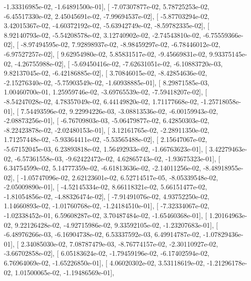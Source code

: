 \documentclass{article}
\begin{document}
         -1.33316985e-02,  -1.64891500e-01],
       [ -7.07307877e-02,   5.78725253e-02,  -6.45517330e-02,
          2.45045691e-02,  -7.99694537e-02],
       [ -5.87703294e-02,   3.42015367e-02,  -4.60372192e-02,
         -5.63942749e-02,  -8.59782335e-02],
       [  8.92140793e-02,  -5.54208578e-02,   3.12740902e-02,
         -2.74543810e-02,  -6.75559366e-02],
       [ -8.97494595e-02,   7.92898937e-02,  -8.98459297e-02,
         -6.78446012e-02,  -6.97527257e-02],
       [  9.62954980e-02,   5.85831517e-02,  -9.45669831e-02,
          9.93375145e-02,  -4.26755988e-02],
       [ -5.69450416e-02,  -7.62631051e-02,  -6.10883720e-03,
          9.82137045e-02,  -6.42186885e-02],
       [  3.70846015e-02,  -8.42854636e-02,  -2.15276340e-02,
         -5.75903549e-02,  -1.60938885e-01],
       [  8.29871585e-03,   1.00460700e-01,   1.25959746e-02,
         -3.69765539e-02,  -7.59418207e-02],
       [ -8.54247028e-02,   4.78357049e-02,   6.44149820e-02,
          1.71177668e-02,  -1.25718058e-01],
       [  7.54493596e-02,   9.22994226e-03,  -3.08813536e-02,
         -6.00159943e-02,  -2.08873256e-01],
       [ -6.76709803e-03,  -5.06479877e-02,   6.42850303e-02,
         -8.22423878e-02,  -2.02480153e-01],
       [  3.12161765e-02,  -2.28911350e-02,   1.71257448e-02,
         -5.93364411e-02,  -5.53565488e-02],
       [  2.15647067e-02,  -5.67152045e-03,   6.23893818e-02,
          1.56492933e-02,  -1.66763623e-01],
       [  3.42279463e-02,  -6.57361558e-03,  -9.62422472e-02,
          4.62865743e-02,  -1.93675323e-01],
       [  6.34754599e-02,   5.14777359e-02,  -6.61813636e-02,
         -2.14011256e-02,  -8.48918955e-02],
       [ -1.05747096e-02,   2.62123601e-02,   6.52714517e-05,
         -8.05339548e-02,  -2.05009890e-01],
       [ -4.52145334e-02,   8.66118321e-02,   5.66151477e-02,
         -1.81054856e-02,  -4.88326474e-02],
       [ -7.91491076e-02,   4.93752250e-02,   1.14660893e-02,
         -1.01760768e-02,  -1.24184510e-01],
       [ -7.32334067e-02,  -1.02338452e-01,   6.59608287e-02,
          3.70487484e-02,  -1.65460368e-01],
       [  1.20164963e-02,   9.22126428e-02,  -4.92715986e-02,
          9.33592105e-02,  -1.23207683e-01],
       [ -6.48976266e-03,  -6.16904738e-02,   6.53337592e-03,
          6.49914787e-02,  -1.07829436e-01],
       [  2.34085030e-02,   7.08787479e-03,  -8.76774157e-02,
         -2.30110927e-02,  -3.66702858e-02],
       [  6.05183624e-02,  -1.79459196e-02,  -6.17402594e-02,
          6.76964069e-02,  -1.65226850e-01],
       [  4.06020302e-02,   3.53118619e-02,  -1.21296178e-02,
          1.01500065e-02,  -1.19486569e-01],
\end{document}
